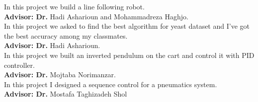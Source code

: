 \documentclass[10pt,a4paper]{altacv}
\begin{document}
In this project we build a line following robot.\\
\textbf{Advisor: Dr.} Hadi Asharioun and Mohammadreza Haghjo.\\
In this project we asked to find the best algorithm for yeast dataset and I've got the best accuracy among my classmates.\\
\textbf{Advisor: Dr.} Hadi Asharioun.\\
\vspace{10pt}
In this project we built an inverted pendulum on the cart and control it with PID controller. \\
\textbf{Advisor: Dr.} Mojtaba Norimanzar.\\
\vspace{10pt}
In this project I designed a sequence control for a pneumatics system.\\
\textbf{Advisor: Dr.} Mostafa Taghizadeh Shol\\


\end{document}

